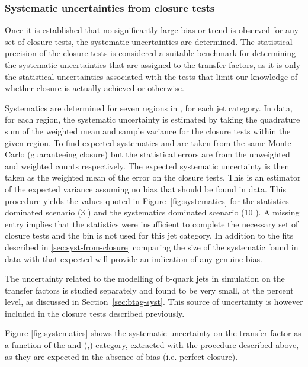 \subsubsection{Systematic uncertainties from closure tests\label{sec:syst-from-closure}}

Once it is established that no significantly large bias or trend is
observed for any set of closure tests, the systematic uncertainties
are determined. The statistical precision of the closure tests is
considered a suitable benchmark for determining the systematic
uncertainties that are assigned to the transfer factors, as it is only
the statistical uncertainties associated with the tests that limit our
knowledge of whether closure is actually achieved or otherwise.

Systematics are determined for seven regions in \scalht,
for each jet category. In data, for each \scalht region, the systematic uncertainty 
is estimated by taking the quadrature sum of the weighted mean and sample variance for 
the closure tests within the given \scalht region. To find expected systematics \nobs and \npre are 
taken from the same Monte Carlo (guaranteeing closure) but the statistical errors are 
from the unweighted and weighted counts respectively. The expected systematic uncertainty is then 
taken as the weighted mean of the error on the closure tests. This is an estimator of the expected variance
assuming no bias that should be found in data. 
This procedure yields the values quoted in Figure~\ref{fig:systematics} for the statistics
dominated scenario (3 \ifb) and the systematics dominated scenario (10 \ifb). 
A missing entry implies that the statistics were insufficient to complete the 
necessary set of closure tests and the \scalht bin is not used for this jet category. 
In addition to the fits described in \ref{sec:syst-from-closure} comparing the 
size of the systematic found in data with that expected will provide 
an indication of any genuine bias.

The uncertainty related to the modelling of b-quark jets
in simulation on the transfer factors is studied separately and 
found to be very small, at the percent level, as discussed in Section~\ref{sec:btag-syst}. 
This source of uncertainty is however included in the closure tests described previously.


Figure \ref{fig:systematics} shows the systematic uncertainty on the transfer factor as a function of the \HT and (\nb,\njet) category, 
extracted with the procedure described above, as they are expected in the absence of bias (i.e. perfect closure).

